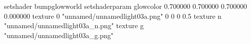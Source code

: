 setshader bumpglowworld
setshaderparam glowcolor 0.700000 0.700000 0.700000 0.000000
texture 0 "unnamed/unnamedlight03a.png" 0 0 0 0.5
texture n "unnamed/unnamedlight03a_n.png"
texture g "unnamed/unnamedlight03a_g.png"